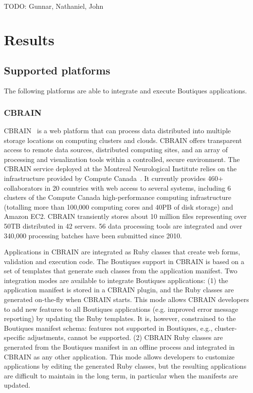 \documentclass{article}
\newcommand{\todo}[1]{\color{red}TODO: #1\color{black}}
\begin{document}
\todo{Gunnar, Nathaniel, John}

\section{Results}
\label{sec:results}

\subsection{Supported platforms}

The following platforms are able to integrate and execute Boutiques
applications. 

\subsubsection{CBRAIN}

CBRAIN~\cite{SHER-14} is a web platform that can process data
distributed into multiple storage locations on computing clusters and
clouds. CBRAIN offers transparent access to remote data sources,
distributed computing sites, and an array of processing and
visualization tools within a controlled, secure environment.  The
CBRAIN service deployed at the Montreal Neurological Institute relies
on the infrastructure provided by Compute Canada~\cite{das2016mni}. It
currently provides 460+ collaborators in 20 countries with web access
to several systems, including 6 clusters of the Compute Canada
high-performance computing infrastructure (totalling more than 100,000
computing cores and 40PB of disk storage) and Amazon EC2. CBRAIN
transiently stores about 10 million files representing over 50TB
distributed in 42 servers. 56 data processing tools are integrated and
over 340,000 processing batches have been submitted since 2010.

Applications in CBRAIN are integrated as Ruby classes that create web
forms, validation and execution code. The Boutiques support in CBRAIN
is based on a set of templates that generate such classes from the
application manifest. Two integration modes are available to integrate
Boutiques applications: (1) the application manifest is stored in a
CBRAIN plugin, and the Ruby classes are generated on-the-fly when
CBRAIN starts. This mode allows CBRAIN developers to add new features
to all Boutiques applications (e.g. improved error message reporting)
by updating the Ruby templates. It is, however, constrained to the
Boutiques manifest schema: features not supported in Boutiques, e.g.,
cluster-specific adjustments, cannot be supported. (2) CBRAIN Ruby
classes are generated from the Boutiques manifest in an offline
process and integrated in CBRAIN as any other application. This mode
allows developers to customize applications by editing the generated
Ruby classes, but the resulting applications are difficult to maintain
in the long term, in particular when the manifests are updated. 
\end{document}
